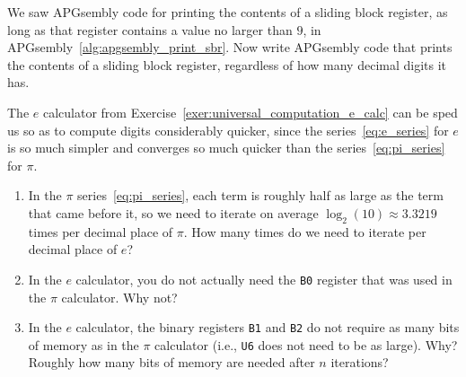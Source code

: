 \begin{multicols}{2}
	\mfilbreak
	
	
	\begin{problem}\label{exer:universal_computation_print_register} 
		We saw APGsembly code for printing the contents of a sliding block register, as long as that register contains a value no larger than $9$, in APGsembly~\ref{alg:apgsembly_print_sbr}. Now write APGsembly code that prints the contents of a sliding block register, regardless of how many decimal digits it has.
		
	\end{problem}
	
	
	\mfilbreak
	
	
	\begin{problem}\label{exer:universal_computation_fast_e_calc} 
		The $e$ calculator from Exercise~\ref{exer:universal_computation_e_calc} can be sped us so as to compute digits considerably quicker, since the series~\eqref{eq:e_series} for $e$ is so much simpler and converges so much quicker than the series~\eqref{eq:pi_series} for $\pi$.\smallskip
		
		\begin{enumerate}[label=\bf\color{ocre}(\alph*)]
			\item In the $\pi$ series~\eqref{eq:pi_series}, each term is roughly half as large as the term that came before it, so we need to iterate on average $\log_2(10) \approx 3.3219$ times per decimal place of $\pi$. How many times do we need to iterate per decimal place of $e$?
			
			\item In the $e$ calculator, you do not actually need the \texttt{B0} register that was used in the $\pi$ calculator. Why not?
			
			\item In the $e$ calculator, the binary registers \texttt{B1} and \texttt{B2} do not require as many bits of memory as in the $\pi$ calculator (i.e., \texttt{U6} does not need to be as large). Why? Roughly how many bits of memory are needed after $n$ iterations?
			

\end{enumerate}
\end{problem}
\end{multicols}
